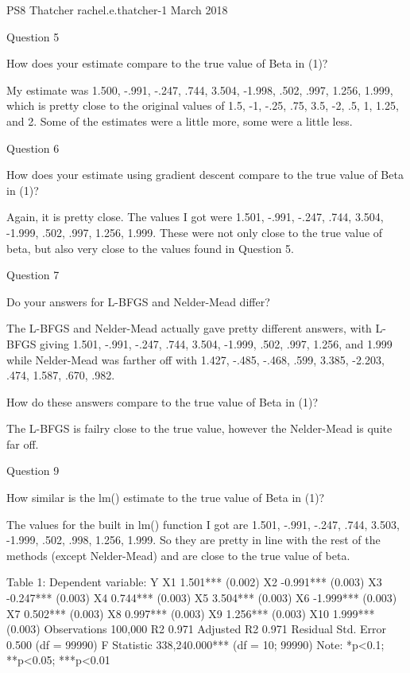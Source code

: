 PS8 Thatcher
rachel.e.thatcher-1
March 2018

Question 5

How does your estimate compare to the true value of Beta in (1)?

My estimate was 1.500, -.991, -.247, .744, 3.504, -1.998, .502, .997, 1.256,
1.999, which is pretty close to the original values of 1.5, -1, -.25, .75, 3.5, -2, .5,
1, 1.25, and 2. Some of the estimates were a little more, some were a little less.

Question 6

How does your estimate using gradient descent compare to the true value of
Beta in (1)?

Again, it is pretty close. The values I got were 1.501, -.991, -.247, .744,
3.504, -1.999, .502, .997, 1.256, 1.999. These were not only close to the true
value of beta, but also very close to the values found in Question 5.

Question 7

Do your answers for L-BFGS and Nelder-Mead differ?

The L-BFGS and Nelder-Mead actually gave pretty different answers, with
L-BFGS giving 1.501, -.991, -.247, .744, 3.504, -1.999, .502, .997, 1.256, and
1.999 while Nelder-Mead was farther off with 1.427, -.485, -.468, .599, 3.385,
-2.203, .474, 1.587, .670, .982.

How do these answers compare to the true value of Beta in (1)?

The L-BFGS is failry close to the true value, however the Nelder-Mead is
quite far off.

Question 9

How similar is the lm() estimate to the true value of Beta in (1)?

The values for the built in lm() function I got are 1.501, -.991, -.247, .744,
3.503, -1.999, .502, .998, 1.256, 1.999. So they are pretty in line with the rest of
the methods (except Nelder-Mead) and are close to the true value of beta.

Table 1:
Dependent variable:
Y
X1 1.501***
(0.002)
X2 -0.991***
(0.003)
X3 -0.247***
(0.003)
X4 0.744***
(0.003)
X5 3.504***
(0.003)
X6 -1.999***
(0.003)
X7 0.502***
(0.003)
X8 0.997***
(0.003)
X9 1.256***
(0.003)
X10 1.999***
(0.003)
Observations 100,000
R2 0.971
Adjusted R2 0.971
Residual Std. Error 0.500 (df = 99990)
F Statistic 338,240.000*** (df = 10; 99990)
Note: *p<0.1; **p<0.05; ***p<0.01
